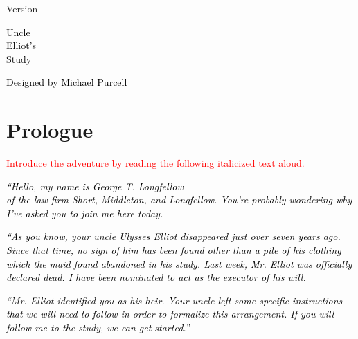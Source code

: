 \documentclass[a6paper, parskip=half, DIV=14, 12pt]{scrartcl}
\begin{document}
{%
\thispagestyle{empty}
		\enlargethispage{3.5\baselineskip} %

\setmainfont[Scale=1.0]{Caslon Antique}
\begin{center}
\makeatletter
{\footnotesize Version \@version}
\makeatother
\end{center}

\vfill

\begin{center}
{
\setmainfont[Scale=2]{Special Elite}
\Huge
\textcolor{black}{Uncle\\[0.75ex]Elliot's\\[0.75ex]Study}
}
\end{center}


\vfill{}

\begin{center}
{
\setmainfont{Bilbo Swash Caps}
\Huge
\textcolor{black}{Designed by Michael Purcell}
}
\end{center}
}


\newpage

\section*{Prologue}


\textcolor{Red}{Introduce the adventure by reading the following italicized text aloud.}

\textcolor{black}{\textit{``Hello, my name is George T. Longfellow\\of the law firm Short, Middleton, and Longfellow. You're probably wondering why I've asked you to join me here today.}}

\textcolor{black}{\textit{``As you know, your uncle Ulysses Elliot disappeared just over seven years ago. Since that time, no sign of him has been found other than a pile of his clothing which the maid found abandoned in his study. Last week, Mr. Elliot was officially declared dead. I have been nominated to act as the executor of his will.}}

\textcolor{black}{\textit{``Mr. Elliot identified you as his heir. Your uncle left some specific instructions that we will need to follow in order to formalize this arrangement. If you will follow me to the study, we can get started.''}}

\newpage
\end{document}
